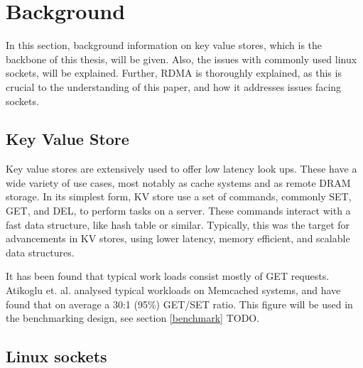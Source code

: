 
\chapter{Background}\label{ch:background} %



\ifpdf
    \graphicspath{{7/figures/PNG/}{7/figures/PDF/}{7/figures/}}
\else
    \graphicspath{{7/figures/EPS/}{7/figures/}}
\fi


%
%
In this section, background information on key value stores, which is the backbone of this thesis, will be given.
Also, the issues with commonly used linux sockets, will be explained.
Further, RDMA is thoroughly explained, as this is crucial to the understanding of this paper, and how it addresses issues facing sockets.

\section[KV-store]{Key Value Store}\label{sec:kv-store}
Key value stores are extensively used to offer low latency look ups.
These have a wide variety of use cases, most notably as cache systems\cite{memcached} and as remote DRAM storage\cite{ousterhout2010case}.
In its simplest form, KV store use a set of commands, commonly SET, GET, and DEL, to perform tasks on a server.
These commands interact with a fast data structure, like hash table or similar.
Typically, this was the target for advancements in KV stores, using lower latency, memory efficient, and scalable data structures.

It has been found that typical work loads consist mostly of GET requests.
Atikoglu et. al. analysed typical workloads on Memcached systems, and have found that on average a 30:1 (95\%) GET/SET ratio\cite{atikoglu2012workload}.
This figure will be used in the benchmarking design, see section \ref{benchmark} TODO.

\section[Linux scokets]{Linux sockets}\label{sec:linux-sockets}

